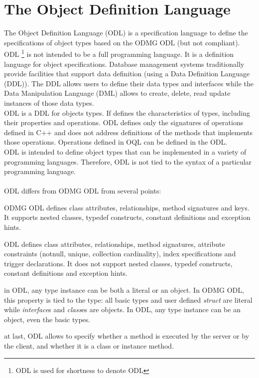 

\newcommand{\mantitle}{\textsc{Object Definition Language}}


\tableofcontents

\chapter*{The Object Definition Language}

The \eyedb Object Definition Language (ODL) is a specification language
to define the specifications of object types based on the ODMG ODL (but not compliant).\\
ODL \footnote{ODL is used for shortness to denote \eyedb ODL} 
is not intended to be a full programming language. It is
a definition language for object specifications. Database management
systems traditionally provide facilities that support
data definition (using a Data Definition Language (DDL)). The DDL allows
users to define their data types and interfaces while the
Data Manipulation Language (DML) allows to create, delete, read update
instances of those data types.\\
ODL is a DDL for objects types.
If defines the characteristics of types, including their properties
and operations.
ODL defines only the signatures of operations defined in C++ and does not
address definitions of the methods that implements those operations.
Operations defined in OQL can be defined in the ODL.
\\
ODL is intended to define object types that can be implemented
in a variety of programming languages. Therefore, ODL is not tied
to the syntax of a particular programming language.\\\\
\eyedb ODL differs from ODMG ODL from several points:
\bi
\item ODMG ODL defines class attributes, relationships, method signatures and keys.
It supports nested classes, typedef constructs, constant definitions and
exception hints.
\item \eyedb ODL defines class attributes, relationships, method signatures,
attribute constraints (notnull, unique, collection cardinality), index
specifications and trigger declarations. It does not support
nested classes, typedef constructs, constant definitions and
exception hints.
\item in \eyedb ODL, any type instance can be both a literal or
an object. In ODMG ODL, this property is tied to the type: all
basic types and user defined \emph{struct} are literal while \emph{interface}s
and \emph{class}es are objects.
In \eyedb ODL, any type instance can be an object, even the basic types.
\item at last, \eyedb ODL allows to specify whether a method is executed by the server or by the client,
and whether it is a class or instance method.
\ei

